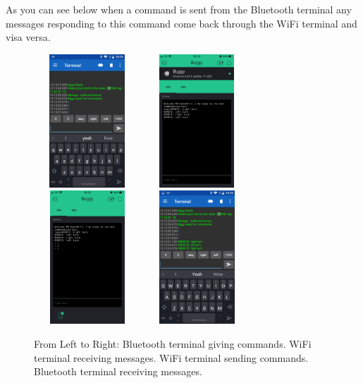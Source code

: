 \documentclass[8pt, a4paper]{article}
\begin{document}
As you can see below when a command is sent from the Bluetooth terminal any messages responding to this command come back through the WiFi terminal and visa versa. 
	
	\begin{figure}[H]
		\centering
		\includegraphics[height=5.0cm, width=4.0cm]{BLE_term}
		\includegraphics[height=5.0cm, width=4.0cm]{blynk_term2}
		\includegraphics[height=5.0cm, width=4.0cm]{blynk_term}
		\includegraphics[height=5.0cm, width=4.0cm]{BLE_term2}
		\caption{From Left to Right: Bluetooth terminal giving commands. WiFi terminal receiving messages. WiFi terminal sending commands. Bluetooth terminal receiving messages.}			
	\end{figure}
	
\end{document}
